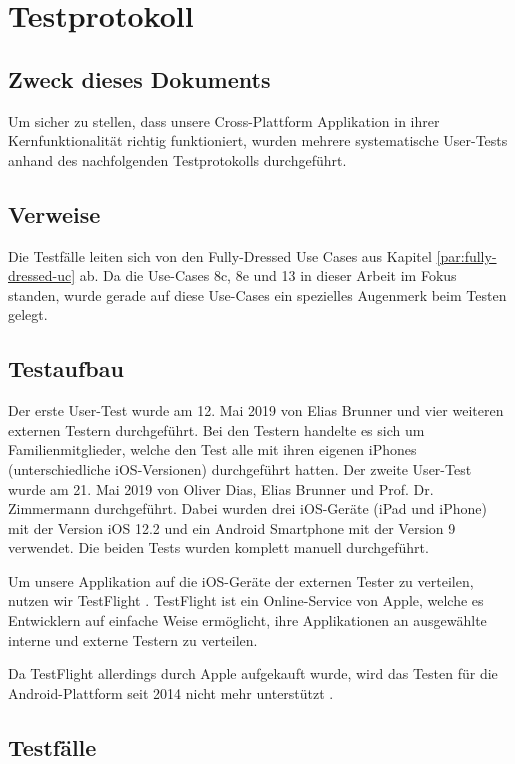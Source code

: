 \section{Testprotokoll}
\subsection{Zweck dieses Dokuments}
Um sicher zu stellen, dass unsere Cross-Plattform Applikation in ihrer Kernfunktionalität richtig funktioniert, wurden mehrere systematische User-Tests anhand des nachfolgenden Testprotokolls durchgeführt.

\subsection{Verweise}
Die Testfälle leiten sich von den Fully-Dressed Use Cases aus Kapitel \ref{par:fully-dressed-uc} ab. Da die Use-Cases 8c, 8e und 13 in dieser Arbeit im Fokus standen, wurde gerade auf diese Use-Cases ein spezielles Augenmerk beim Testen gelegt.

\subsection{Testaufbau}
Der erste User-Test wurde am 12. Mai 2019 von Elias Brunner und vier weiteren externen Testern durchgeführt. Bei den Testern handelte es sich um Familienmitglieder, welche den Test alle mit ihren eigenen iPhones (unterschiedliche iOS-Versionen) durchgeführt hatten.
Der zweite User-Test wurde am 21. Mai 2019 von Oliver Dias, Elias Brunner und Prof. Dr. Zimmermann durchgeführt. Dabei wurden drei iOS-Geräte (iPad und iPhone) mit der Version iOS 12.2 und ein Android Smartphone mit der Version 9 verwendet. 
Die beiden Tests wurden komplett manuell durchgeführt.

Um unsere Applikation auf die iOS-Geräte der externen Tester zu verteilen, nutzen wir TestFlight \cite{testflight}. TestFlight ist ein Online-Service von Apple, welche es Entwicklern auf einfache Weise ermöglicht, ihre Applikationen an ausgewählte interne und externe Testern zu verteilen. 

Da TestFlight allerdings durch Apple aufgekauft wurde, wird das Testen für die Android-Plattform seit 2014 nicht mehr unterstützt \cite{testflightWikipedia}. 

\subsection{Testfälle}


